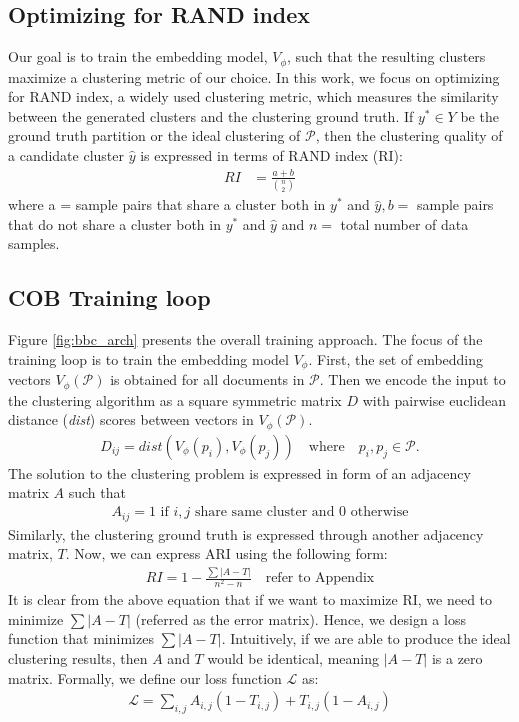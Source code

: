 \documentclass[11pt,a4paper]{article}
\begin{document}
\subsection{Optimizing for RAND index} Our goal is to train the embedding model, $V_\phi$, such that the resulting clusters maximize a clustering metric of our choice. In this work, we focus on optimizing for RAND index, a widely used clustering metric, which measures the similarity between the generated clusters and the clustering ground truth. If $y^* \in Y$ be the ground truth partition or the ideal clustering of $\mathcal{P}$, then the clustering quality of a candidate cluster $\hat{y}$ is expressed in terms of RAND index (RI):
\begin{align*}
RI &= \frac{a+b}{\binom{n}{2}}
\end{align*}
where a = sample pairs that share a cluster both in $y^*$ and $\hat{y}, b=$ sample pairs that do not share a cluster both in $y^*$ and $\hat{y}$ and $n=$ total number of data samples.

\subsection{COB Training loop}
Figure \ref{fig:bbc_arch} presents the overall training approach. The focus of the training loop is to train the embedding model $V_\phi$. First, the set of embedding vectors $V_\phi(\mathcal{P})$ is obtained for all documents in $\mathcal{P}$. Then we encode the input to the clustering algorithm as a square symmetric matrix $D$ with pairwise euclidean distance (\textit{dist}) scores between vectors in $V_\phi(\mathcal{P})$. 
\begin{align*}
D_{ij} = dist(V_\phi(p_i), V_\phi(p_j)) \quad \textrm{where} \quad p_i,p_j \in \mathcal{P}.    
\end{align*}
The solution to the clustering problem is expressed in form of an adjacency matrix $A$ such that
\begin{align*}
A_{ij} = 1 \textrm{ if } i,j \textrm{ share same cluster and } 0 \textrm{ otherwise}    
\end{align*}
Similarly, the clustering ground truth is expressed through another adjacency matrix, $T$. Now, we can express ARI using the following form:
\begin{align*}
    RI=1-\frac{\sum |A-T|}{n^2-n} \quad \textrm{refer to Appendix}
\end{align*}
It is clear from the above equation that if we want to maximize RI, we need to minimize $\sum |A-T|$ (referred as the error matrix). Hence, we design a loss function that minimizes $\sum |A-T|$. Intuitively, if we are able to produce the ideal clustering results, then $A$ and $T$ would be identical, meaning $|A-T|$ is a zero matrix. Formally, we define our loss function $\mathcal{L}$ as:
\begin{align*}
\mathcal{L} = \sum_{i,j} A_{i,j}(1-T_{i,j}) + T_{i,j}(1-A_{i,j})
\end{align*}
\end{document}
